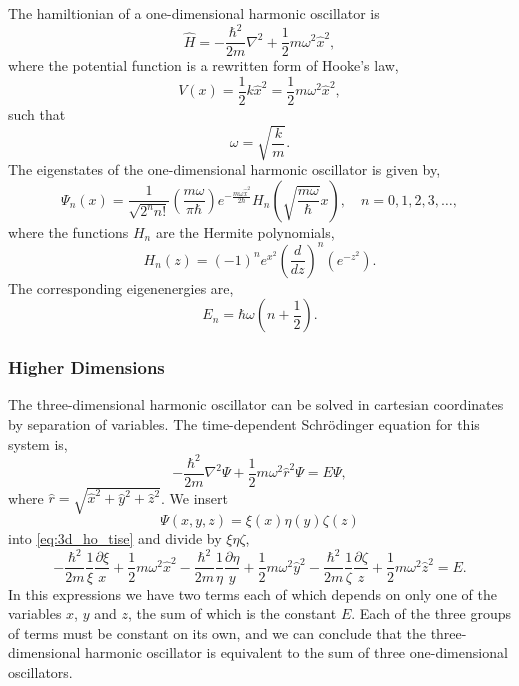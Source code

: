 The hamiltionian of a one-dimensional harmonic oscillator is
\begin{equation}
    \hat{H} = -\frac{\hbar^2}{2m} \nabla^2 + \frac{1}{2}m\omega^2\hat{x}^2,
\end{equation}
where the potential function is a rewritten form of Hooke's law,
\begin{equation}
    V(x) = \frac{1}{2}k \hat{x}^2 = \frac{1}{2}m\omega^2\hat{x}^2,
\end{equation}
such that 
\begin{equation*}
    \omega = \sqrt{\frac{k}{m}}.
\end{equation*}
The eigenstates of the one-dimensional harmonic oscillator is given by,
\begin{equation}
    \Psi_n(x) =
        \frac{1}{\sqrt{2^n n!}} 
        \left(\frac{m\omega}{\pi\hbar} \right) 
        e^{-\frac{m\omega\hat{x}^2}{2\hbar}}
        H_n\left(\sqrt{\frac{m\omega}{\hbar}} x \right),
        \quad n=0,1,2,3,\dots,
\end{equation}
where the functions $H_n$ are the Hermite polynomials,
\begin{equation}
    H_n(z) = 
    (-1)^n e^{x^2}
    \left(\frac{d}{dz} \right)^n
    \left(e^{-z^2} \right).
\end{equation}
The corresponding eigenenergies are,
\begin{equation}
    E_n = \hbar\omega\left(n + \frac{1}{2} \right).
\end{equation}

\subsubsection{Higher Dimensions}

The three-dimensional harmonic oscillator can be solved in cartesian 
coordinates by separation of variables. The time-dependent Schrödinger
equation for this system is,
\begin{equation}
    \label{eq:3d_ho_tise}
    -\frac{\hbar^2}{2m} \nabla^2\Psi
    +\frac{1}{2}m\omega^2\hat{r}^2\Psi = E\Psi,
\end{equation}
where $\hat{r} = \sqrt{\hat{x}^2 + \hat{y}^2 + \hat{z}^2}$. We insert
\begin{equation*}
    \Psi(x, y, z) = \xi(x)\eta(y)\zeta(z)
\end{equation*}
into \autoref{eq:3d_ho_tise} and divide by $\xi\eta\zeta$,
\begin{equation}
    -\frac{\hbar^2}{2m}\frac{1}{\xi}\frac{\partial \xi}{x}
    +\frac{1}{2}m\omega^2\hat{x}^2
    -\frac{\hbar^2}{2m}\frac{1}{\eta}\frac{\partial \eta}{y}
    +\frac{1}{2}m\omega^2\hat{y}^2
    -\frac{\hbar^2}{2m}\frac{1}{\zeta}\frac{\partial \zeta}{z}
    +\frac{1}{2}m\omega^2\hat{z}^2 = E.
\end{equation}
In this expressions we have two terms each of which depends on 
only one of the variables $x$, $y$ and $z$, the sum of which is 
the constant $E$. Each of the three groups of terms must be constant 
on its own, and we can conclude that the three-dimensional harmonic 
oscillator is equivalent to the sum of three one-dimensional 
oscillators.


